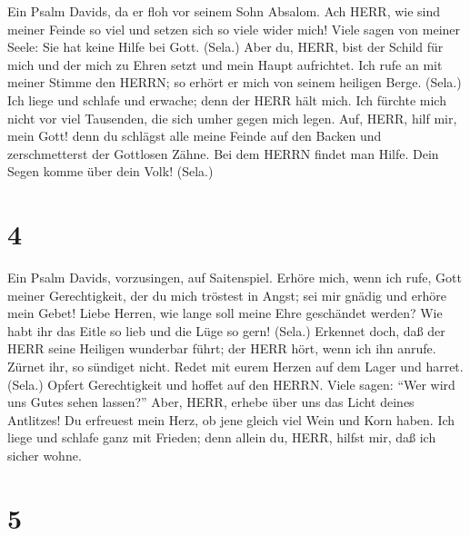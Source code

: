  Ein Psalm Davids, da er floh vor seinem Sohn Absalom. Ach
HERR, wie sind meiner Feinde so viel und setzen sich so viele wider
mich!  Viele sagen von meiner Seele: Sie hat keine Hilfe bei
Gott. (Sela.)  Aber du, HERR, bist der Schild für mich und
der mich zu Ehren setzt und mein Haupt aufrichtet.  Ich rufe
an mit meiner Stimme den HERRN; so erhört er mich von seinem heiligen
Berge. (Sela.)  Ich liege und schlafe und erwache; denn der
HERR hält mich.  Ich fürchte mich nicht vor viel Tausenden,
die sich umher gegen mich legen.  Auf, HERR, hilf mir, mein
Gott! denn du schlägst alle meine Feinde auf den Backen und
zerschmetterst der Gottlosen Zähne.  Bei dem HERRN findet
man Hilfe. Dein Segen komme über dein Volk! (Sela.)

\hypertarget{section-3}{%
\section{4}\label{section-3}}

 Ein Psalm Davids, vorzusingen, auf Saitenspiel. Erhöre
mich, wenn ich rufe, Gott meiner Gerechtigkeit, der du mich tröstest in
Angst; sei mir gnädig und erhöre mein Gebet!  Liebe Herren,
wie lange soll meine Ehre geschändet werden? Wie habt ihr das Eitle so
lieb und die Lüge so gern! (Sela.)  Erkennet doch, daß der
HERR seine Heiligen wunderbar führt; der HERR hört, wenn ich ihn anrufe.
 Zürnet ihr, so sündiget nicht. Redet mit eurem Herzen auf
dem Lager und harret. (Sela.)  Opfert Gerechtigkeit und
hoffet auf den HERRN.  Viele sagen: ``Wer wird uns Gutes
sehen lassen?'' Aber, HERR, erhebe über uns das Licht deines Antlitzes!
 Du erfreuest mein Herz, ob jene gleich viel Wein und Korn
haben.  Ich liege und schlafe ganz mit Frieden; denn allein
du, HERR, hilfst mir, daß ich sicher wohne.

\hypertarget{section-4}{%
\section{5}\label{section-4}}

